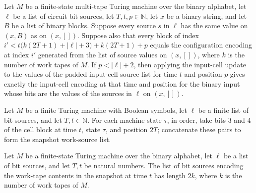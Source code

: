 \begin{theorem}
\label{Complexity.inp_block}
\leanok
{}
Let $M$ be a finite-state multi-tape Turing machine over the binary alphabet, let $\ell$
be a list of circuit bit sources, let $T,t,p\in\mathbb N$, let $x$ be a binary string,
and let $B$ be a list of binary blocks. Suppose every source $s$ in $\ell$ has the same
value on $(x,B)$ as on $(x,[])$. Suppose also that every block of index
$i'<t\bigl(k(2T+1)+|\ell|+3\bigr)+k(2T+1)+p$ equals the configuration encoding at index
$i'$ generated from the list of source values on $(x,[])$, where $k$ is the number of
work tapes of $M$. If $p<|\ell|+2$, then applying the input-cell update to the values of
the padded input-cell source list for time $t$ and position $p$ gives exactly the
input-cell encoding at that time and position for the binary input whose bits are the
values of the sources in $\ell$ on $(x,[])$.
\end{theorem}

\begin{definition}
\label{Complexity.snapWorkSrcs}
\leanok
{}
Let $M$ be a finite Turing machine with Boolean symbols, let $\ell$ be a finite list of
bit sources, and let $T,t\in\mathbb{N}$. For each machine state $\tau$, in order, take
bits $3$ and $4$ of the cell block at time $t$, state $\tau$, and position $2T$;
concatenate these pairs to form the snapshot work-source list.
\end{definition}

\begin{theorem}
\label{Complexity.length_snapWorkSrcs}
\leanok
{}
Let $M$ be a finite-state Turing machine over the binary alphabet, let $\ell$ be a list
of bit sources, and let $T,t$ be natural numbers. The list of bit sources encoding the
work-tape contents in the snapshot at time $t$ has length $2k$, where $k$ is the number
of work tapes of $M$.
\end{theorem}

